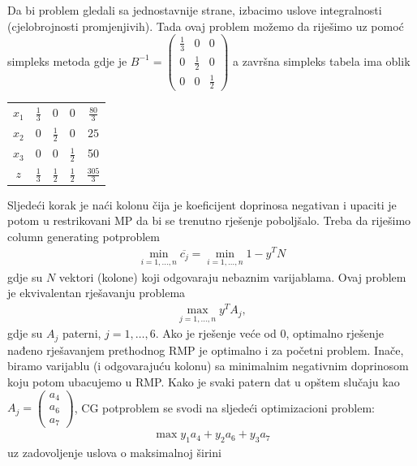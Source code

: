 \documentclass[a4paper, utf8, 11pt, colorlinks]{book}
\begin{document}
Da bi problem gledali sa jednostavnije strane, izbacimo uslove integralnosti (cjelobrojnosti promjenjivih). Tada ovaj problem možemo da riješimo uz pomoć simpleks metoda gdje je 
$B^{-1} =\begin{pmatrix}
	    \frac{1}{3} & 0 & 0 \\
	    0 & \frac{1}{2} & 0  \\
	    0 &   0 & \frac{1}{2}
\end{pmatrix}$ a završna simpleks tabela ima oblik 

\begin{center}
 
\begin{tabular}{cccc|c}
	  $x_1$ &     $\frac{1}{3}$  &   0 & 0  & $\frac{80}{3}$ \\
	  $x_2$ &     0              &  $\frac{1}{2}$  & 0 & $25$ \\
	  $x_3$ &     0              &  0    &  $\frac{1}{2}$  & 50 \\ \hline
	  $z$   &  $\frac{1}{3}$     &  $\frac{1}{2}$   &  $\frac{1}{2}$ & $\frac{305}{3}$ 
\end{tabular}
\end{center}
Sljedeći korak je naći kolonu čija je koeficijent doprinosa negativan i upaciti je potom u restrikovani MP da bi se trenutno rješenje poboljšalo. Treba da riješimo column generating potproblem
\begin{align}
	\min_{i=1,\ldots,n} \overline{c_j} = \min_{i=1,\ldots,n} 1 - y^T N
\end{align}
gdje su $N$ vektori (kolone) koji odgovaraju nebaznim varijablama. Ovaj problem je ekvivalentan rješavanju problema
\begin{align}
	\max_{j=1,\ldots,n} y^T A_j,
\end{align}
gdje su $A_j$ paterni, $j=1,\ldots, 6$. 
Ako je rješenje veće od 0, optimalno rješenje nađeno rješavanjem prethodnog RMP je optimalno i za početni problem. Inače, biramo varijablu (i odgovarajuću kolonu) sa minimalnim negativnim doprinosom koju potom ubacujemo u RMP. Kako je svaki patern dat u opštem slučaju kao $A_j = \begin{pmatrix}
	a_4 \\
	a_6 \\
	a_7
\end{pmatrix}$, CG potproblem se svodi na sljedeći optimizacioni problem:
\begin{align}
	 \max y_1 a_4 + y_2 a_6 + y_3 a_7  
\end{align}
uz zadovoljenje uslova o maksimalnoj širini
\end{document}
